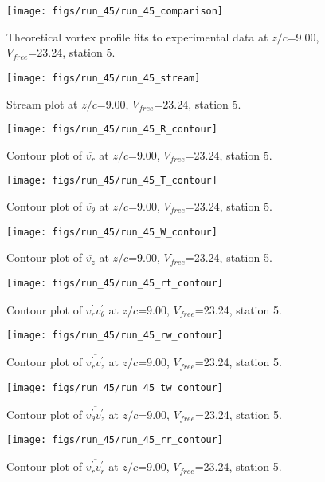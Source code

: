 \begin{figure}[H]
\centering
\texttt{[image: figs/run\_45/run\_45\_comparison]}
\caption{Theoretical vortex profile fits to experimental data at $z/c$=9.00, $V_{free}$=23.24, station 5.}
\end{figure}


\begin{figure}[H]
\centering
\texttt{[image: figs/run\_45/run\_45\_stream]}
\caption{Stream plot at $z/c$=9.00, $V_{free}$=23.24, station 5.}
\end{figure}


\begin{figure}[H]
\centering
\texttt{[image: figs/run\_45/run\_45\_R\_contour]}
\caption{Contour plot of $\overline{v_{r}}$ at $z/c$=9.00, $V_{free}$=23.24, station 5.}
\end{figure}


\begin{figure}[H]
\centering
\texttt{[image: figs/run\_45/run\_45\_T\_contour]}
\caption{Contour plot of $\overline{v_{\theta}}$ at $z/c$=9.00, $V_{free}$=23.24, station 5.}
\end{figure}


\begin{figure}[H]
\centering
\texttt{[image: figs/run\_45/run\_45\_W\_contour]}
\caption{Contour plot of $\overline{v_{z}}$ at $z/c$=9.00, $V_{free}$=23.24, station 5.}
\end{figure}


\begin{figure}[H]
\centering
\texttt{[image: figs/run\_45/run\_45\_rt\_contour]}
\caption{Contour plot of $\overline{v_{r}^{\prime} v_{\theta}^{\prime}}$ at $z/c$=9.00, $V_{free}$=23.24, station 5.}
\end{figure}


\begin{figure}[H]
\centering
\texttt{[image: figs/run\_45/run\_45\_rw\_contour]}
\caption{Contour plot of $\overline{v_{r}^{\prime} v_{z}^{\prime}}$ at $z/c$=9.00, $V_{free}$=23.24, station 5.}
\end{figure}


\begin{figure}[H]
\centering
\texttt{[image: figs/run\_45/run\_45\_tw\_contour]}
\caption{Contour plot of $\overline{v_{\theta}^{\prime} v_{z}^{\prime}}$ at $z/c$=9.00, $V_{free}$=23.24, station 5.}
\end{figure}


\begin{figure}[H]
\centering
\texttt{[image: figs/run\_45/run\_45\_rr\_contour]}
\caption{Contour plot of $\overline{v_{r}^{\prime} v_{r}^{\prime}}$ at $z/c$=9.00, $V_{free}$=23.24, station 5.}
\end{figure}


